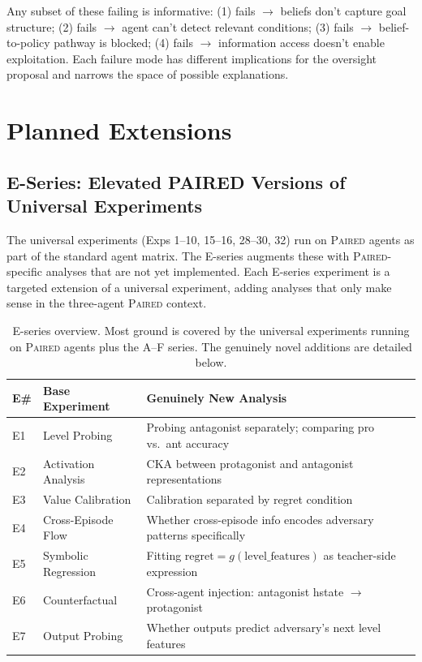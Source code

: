 \documentclass[11pt,a4paper]{article}
\theoremstyle{remark}
\newcommand{\paired}{\textsc{Paired}}
\begin{document}
Any subset of these failing is informative: (1) fails $\to$ beliefs don't capture goal structure; (2) fails $\to$ agent can't detect relevant conditions; (3) fails $\to$ belief-to-policy pathway is blocked; (4) fails $\to$ information access doesn't enable exploitation. Each failure mode has different implications for the oversight proposal and narrows the space of possible explanations.


\section{Planned Extensions}
\label{sec:extensions}

\subsection{E-Series: Elevated PAIRED Versions of Universal Experiments}

The universal experiments (Exps 1--10, 15--16, 28--30, 32) run on \paired{} agents as part of the standard agent matrix. The E-series augments these with \paired{}-specific analyses that are not yet implemented. Each E-series experiment is a targeted extension of a universal experiment, adding analyses that only make sense in the three-agent \paired{} context.

\begin{table}[H]
\centering
\caption{E-series overview. Most ground is covered by the universal experiments running on \paired{} agents plus the A--F series. The genuinely novel additions are detailed below.}
\begin{tabularx}{\textwidth}{l >{\raggedright\arraybackslash}p{3.5cm} X}
\toprule
\textbf{E\#} & \textbf{Base Experiment} & \textbf{Genuinely New Analysis} \\
\midrule
E1 & Level Probing & Probing antagonist separately; comparing pro vs.\ ant accuracy \\
E2 & Activation Analysis & CKA between protagonist and antagonist representations \\
E3 & Value Calibration & Calibration separated by regret condition \\
E4 & Cross-Episode Flow & Whether cross-episode info encodes adversary patterns specifically \\
E5 & Symbolic Regression & Fitting $\text{regret} = g(\text{level\_features})$ as teacher-side expression \\
E6 & Counterfactual & Cross-agent injection: antagonist hstate $\to$ protagonist \\
E7 & Output Probing & Whether outputs predict adversary's next level features \\
\bottomrule
\end{tabularx}
\end{table}
\end{document}
